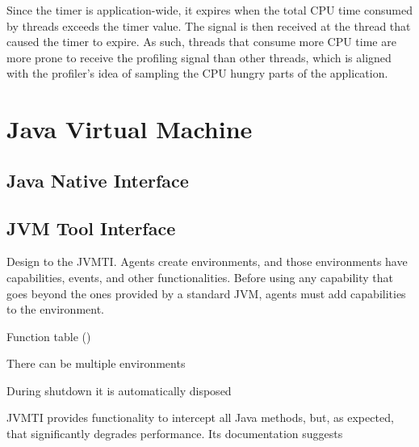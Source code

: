 Since the timer is application-wide, it expires when the total CPU time consumed by threads exceeds the timer value. The signal is then received at the thread that caused the timer to expire. As such, threads that consume more CPU time are more prone to receive the profiling signal than other threads, which is aligned with the profiler's idea of sampling the CPU hungry parts of the application.
\fi


\section{Java Virtual Machine}



\subsection{Java Native Interface}



\subsection{JVM Tool Interface}


\iffalse
Design to the JVMTI. Agents create environments, and those environments have capabilities, events, and other functionalities. Before using any capability that goes beyond the ones provided by a standard JVM, agents must add capabilities to the environment. %

Function table ()

There can be multiple environments

During shutdown it is automatically disposed


JVMTI provides functionality to intercept all Java methods, but, as expected, that significantly degrades performance. Its documentation suggests

